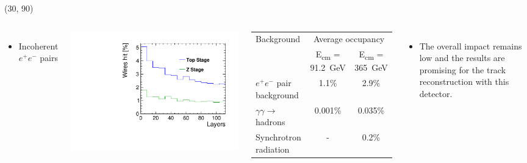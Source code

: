 \documentclass[final,xcolor={dvipsnames,svgnames,x11names,table}]{beamer}
\begin{document}
\begin{frame}
\begin{textblock}{40}
\begin{tcolorbox}[title=Main sources of beam-induced backgrounds]
  \end{tcolorbox}
\end{textblock}


\begin{textblock}{50}(30, 90)
  \begin{tcolorbox}[title=3 main sources of beam-induced backgrounds at the top stage]

  \begin{columns}

    \begin{itemize}
      \item Incoherent $e^+e^-$ pairs
    \end{itemize}
    \centering
    \includegraphics[width=\textwidth]{Figures/incoherent_top_Z.pdf}

    \begin{tabular}{l c c}
      \toprule
       Background & \multicolumn{2}{c}{Average occupancy} \\
        & E\textsubscript{cm} = 91.2~GeV &  E\textsubscript{cm} = 365~GeV \\
       \midrule
       $e^+e^-$ pair background & 1.1\% & 2.9\% \\
       $\gamma\gamma\rightarrow$ hadrons & 0.001\% & 0.035\%  \\
       Synchrotron radiation & - & 0.2\% \\
       \bottomrule
    \end{tabular}

    \begin{itemize}
      \item The overall impact remains low and the results are promising for the track reconstruction with this detector.
    \end{itemize}

  \end{columns}

  \end{tcolorbox}
\end{textblock}

\end{frame}
\end{document}
